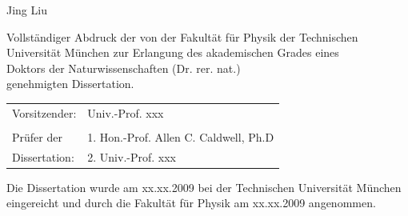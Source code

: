 \begin{titlepage}
\Large Jing Liu

\vspace{2. cm}

\normalsize Vollst\"andiger Abdruck der von der Fakult\"at f\"ur
Physik der Technischen Universit\"at M\"unchen zur Erlangung des
akademischen Grades eines \\
Doktors der Naturwissenschaften (Dr. rer. nat.) \\
genehmigten Dissertation. \\

\vspace{1.5 cm} 

\begin{table}[h]
  \centering
  \begin{tabular}{ll}
    Vorsitzender: & Univ.-Prof. xxx\\ 
    & \\ 
    Pr\"ufer der & 1. Hon.-Prof. Allen C. Caldwell, Ph.D \\ 
    Dissertation: & 2. Univ.-Prof. xxx \\ 
  \end{tabular}
\end{table}

\vspace{2.0 cm} 

Die Dissertation wurde am xx.xx.2009 bei der Technischen Universit\"at
M\"unchen eingereicht und durch die Fakult\"at f\"ur Physik am
xx.xx.2009 angenommen. \\

\end{titlepage} 

\cleardoublepage

